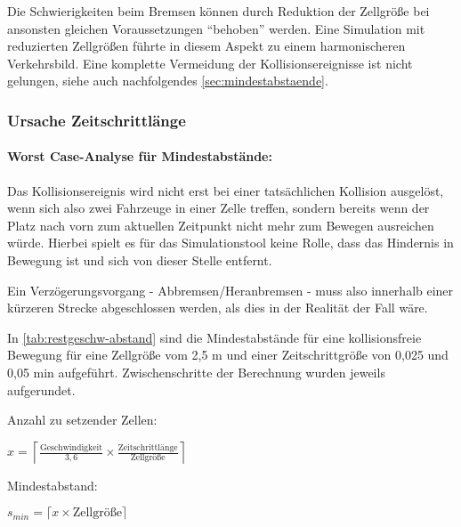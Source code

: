 Die Schwierigkeiten beim Bremsen können durch Reduktion der Zellgröße bei ansonsten gleichen Voraussetzungen \enquote{behoben} werden.
Eine Simulation mit reduzierten Zellgrößen führte in diesem Aspekt zu einem harmonischeren Verkehrsbild.
Eine komplette Vermeidung der Kollisionsereignisse ist nicht gelungen, siehe auch nachfolgendes \cref{sec:mindestabstaende}.




\subsubsection{Ursache Zeitschrittlänge}

\paragraph*{Worst Case-Analyse für Mindestabstände:}
\label{sec:mindestabstaende}

Das Kollisionsereignis wird nicht erst bei einer tatsächlichen Kollision ausgelöst, wenn sich also zwei Fahrzeuge in einer Zelle treffen, sondern bereits wenn der Platz nach vorn zum aktuellen Zeitpunkt nicht mehr zum Bewegen ausreichen würde.
Hierbei spielt es für das Simulationstool keine Rolle, dass das Hindernis in Bewegung ist und sich von dieser Stelle entfernt.

Ein Verzögerungsvorgang - Abbremsen/Heranbremsen - muss also innerhalb einer kürzeren Strecke abgeschlossen werden, als dies in der Realität der Fall wäre.

In \cref{tab:restgeschw-abstand} sind die Mindestabstände für eine kollisionsfreie Bewegung für eine Zellgröße vom 2,5 m und einer Zeitschrittgröße von 0,025 und 0,05 min aufgeführt.
Zwischenschritte der Berechnung wurden jeweils aufgerundet.

\noindent
Anzahl zu setzender Zellen: 
\begin{center}
$ x = \left\lceil \frac{\text{Geschwindigkeit}}{3,6} \times \frac{\text{Zeitschrittlänge}}{\text{Zellgröße}} \right\rceil $
\end{center}
Mindestabstand: 
\begin{center}
$ s_{min} = \lceil x \times \text{Zellgröße} \rceil $
\end{center}

